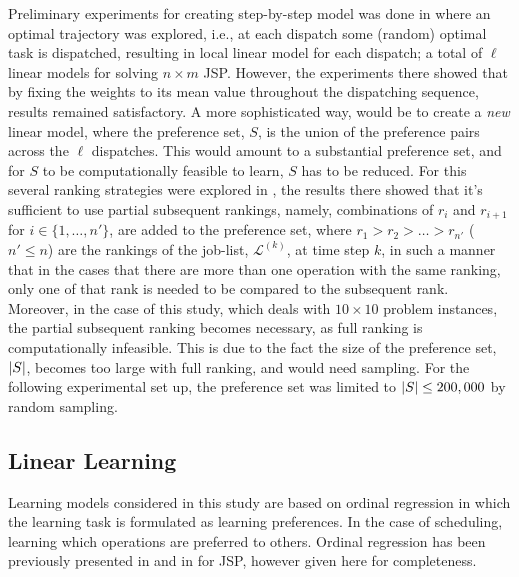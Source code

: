 \documentclass[smallextended]{svjour3}
\begin{document}
Preliminary experiments for creating step-by-step model was done in 
\cite{InRu11a} where an optimal trajectory was explored, i.e., at each dispatch 
some (random) optimal task is dispatched, resulting in local linear model for 
each dispatch; a total of $\ell$ linear models for solving $n\times m$ JSP. 
However, the experiments there showed that by fixing the weights to its mean 
value throughout the dispatching sequence, results remained satisfactory.
A more sophisticated way, would be to create a \emph{new} linear model, where 
the preference set, $S$, is the union of the preference pairs across the $\ell$ 
dispatches. 
This would amount to a substantial preference set, and for $S$ to be 
computationally feasible to learn, $S$ has to be reduced. For this several 
ranking strategies were explored in \cite{InRu15a}, the results there showed 
that it's sufficient to use partial subsequent rankings, namely, combinations 
of $r_i$ and $r_{i+1}$ for $i\in\{1,\ldots,n'\}$, are added to the preference 
set, where $r_1>r_2>\ldots>r_{n'}$ ($n'\leq n$) are the rankings of the 
job-list, $\mathcal{L}^{(k)}$, at time step $k$, in such a manner that in the 
cases that there are more than one operation with the same ranking, only one of 
that rank is needed to be compared to the subsequent rank. 
Moreover, in the case of this study, which deals with $10\times 10$ problem 
instances, the partial subsequent ranking becomes necessary, as full ranking is 
computationally infeasible. This is due to the fact the size of the preference 
set, $\lvert S\rvert$, becomes too large with full ranking, and would need sampling.
For the following experimental set up, the preference set was limited to 
$\lvert S\rvert\leq200,000$ by random sampling.

\subsection{Linear Learning}\label{sec:liblinear}

Learning models considered in this study are based on ordinal regression in 
which the learning task is formulated as learning preferences. In the case of 
scheduling, learning which operations are preferred to others. Ordinal 
regression has been previously presented in \cite{Ru06:PPSN} and in 
\cite{InRu11a} for JSP, however given here for completeness. 
\end{document}
